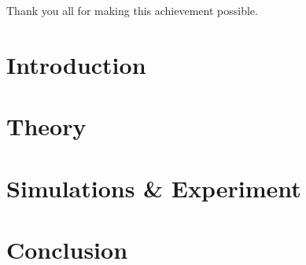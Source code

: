 \documentclass[a4paper,11pt]{report}
\begin{document}
Thank you all for making this achievement possible.

\newpage

\tableofcontents
\chapter{Introduction}


\chapter{Theory}


\chapter{Simulations \& Experiment}


\chapter{ }


\chapter{Conclusion}


\nocite{*}
\printbibliography[heading=bibintoc]

\begin{appendix}

\end{appendix}
\end{document}
